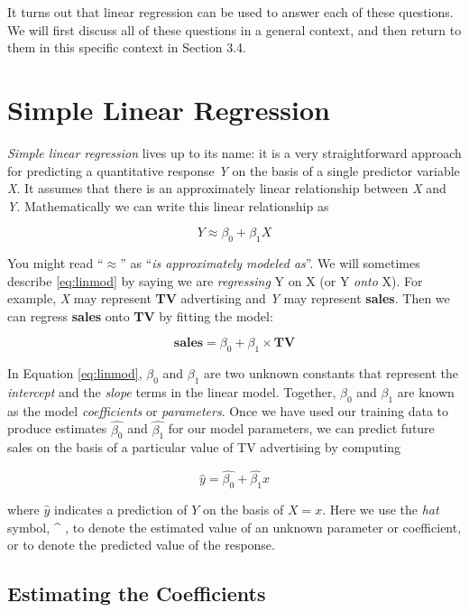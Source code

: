 \documentclass[
]{book}
\begin{document}
It turns out that linear regression can be used to answer each of these questions.
We will first discuss all of these questions in a general context, and then return to them in this specific context in Section 3.4.

\hypertarget{simple-lin-reg}{%
\section{Simple Linear Regression}\label{simple-lin-reg}}

\emph{Simple linear regression} lives up to its name: it is a very straightforward approach for predicting a quantitative response \emph{Y} on the basis of a single predictor variable \emph{X}.
It assumes that there is an approximately linear relationship between \emph{X} and \emph{Y}.
Mathematically we can write this linear relationship as

\begin{equation} 
  Y \approx \beta_0 + \beta_1X
  \label{eq:linmod}
\end{equation}

You might read ``\(\approx\)'' as ``\emph{is approximately modeled as}''.
We will sometimes describe \eqref{eq:linmod} by saying we are \emph{regressing} Y on X (or Y \emph{onto} X).
For example, \emph{X} may represent \textbf{TV} advertising and \emph{Y} may represent \textbf{sales}.
Then we can regress \textbf{sales} onto \textbf{TV} by fitting the model:

\[\textbf{sales} = \beta_0+\beta_1\times\textbf{TV}\]

In Equation \eqref{eq:linmod}, \(\beta_0\) and \(\beta_1\) are two unknown constants that represent the \emph{intercept} and the \emph{slope} terms in the linear model.
Together, \(\beta_0\) and \(\beta_1\) are known as the model \emph{coefficients} or \emph{parameters}.
Once we have used our training data to produce estimates \(\hat{\beta_0}\) and \(\hat{\beta_1}\) for our model parameters, we can predict future sales on the basis of a particular value of TV advertising by computing

\begin{equation} 
  \hat{y} = \hat{\beta_0} + \hat{\beta_1}x
  \label{eq:linest}
\end{equation}

where \(\hat{y}\) indicates a prediction of \(Y\) on the basis of \(X=x\).
Here we use the \emph{hat} symbol, \^{} , to denote the estimated value of an unknown parameter or coefficient, or to denote the predicted value of the response.

\hypertarget{estimating-the-coefficients}{%
\subsection{Estimating the Coefficients}\label{estimating-the-coefficients}}

  
\end{document}
